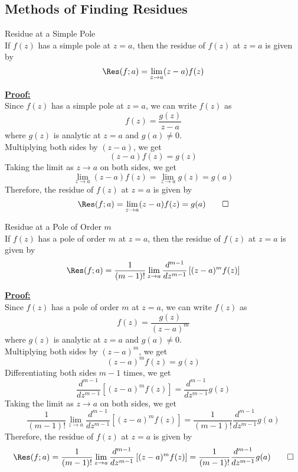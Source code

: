 \subsection{Methods of Finding Residues}
\begin{theorem}{Residue at a Simple Pole}{}
    \\If $f(z)$ has a simple pole at $z=a$, then the residue of $f(z)$ at $z=a$ is given by
    \[ \Res(f;a) = \lim_{z \to a} (z-a)f(z) \]
\end{theorem}

\underline{\textbf{Proof:}} \\
Since $f(z)$ has a simple pole at $z=a$, we can write $f(z)$ as
\[ f(z) = \frac{g(z)}{z-a} \]
where $g(z)$ is analytic at $z=a$ and $g(a) \neq 0$. \\
Multiplying both sides by $(z-a)$, we get
\[ (z-a)f(z) = g(z) \]
Taking the limit as $z \to a$ on both sides, we get
\[ \lim_{z \to a} (z-a)f(z) = \lim_{z \to a} g(z) = g(a) \]
Therefore, the residue of $f(z)$ at $z=a$ is given by
\[ \Res(f;a) = \lim_{z \to a} (z-a)f(z) = g(a) \qed\]

\begin{theorem}{Residue at a Pole of Order $m$}{}
    \\If $f(z)$ has a pole of order $m$ at $z=a$, then the residue of $f(z)$ at $z=a$ is given by
    \[ \Res(f;a) = \frac{1}{(m-1)!} \lim_{z \to a} \frac{d^{m-1}}{dz^{m-1}} \left[ (z-a)^m f(z) \right] \]
\end{theorem}

\underline{\textbf{Proof:}} \\
Since $f(z)$ has a pole of order $m$ at $z=a$, we can write $f(z)$ as
\[ f(z) = \frac{g(z)}{(z-a)^m} \]
where $g(z)$ is analytic at $z=a$ and $g(a) \neq 0$. \\
Multiplying both sides by $(z-a)^m$, we get
\[ (z-a)^m f(z) = g(z) \]
Differentiating both sides $m-1$ times, we get
\[ \frac{d^{m-1}}{dz^{m-1}} \left[ (z-a)^m f(z) \right] = \frac{d^{m-1}}{dz^{m-1}} g(z) \]
Taking the limit as $z \to a$ on both sides, we get
\[ \frac{1}{(m-1)!} \lim_{z \to a} \frac{d^{m-1}}{dz^{m-1}} \left[ (z-a)^m f(z) \right] = \frac{1}{(m-1)!} \frac{d^{m-1}}{dz^{m-1}} g(a) \]
Therefore, the residue of $f(z)$ at $z=a$ is given by
\[ \Res(f;a) = \frac{1}{(m-1)!} \lim_{z \to a} \frac{d^{m-1}}{dz^{m-1}} \left[ (z-a)^m f(z) \right] = \frac{1}{(m-1)!} \frac{d^{m-1}}{dz^{m-1}} g(a) \qed \]
